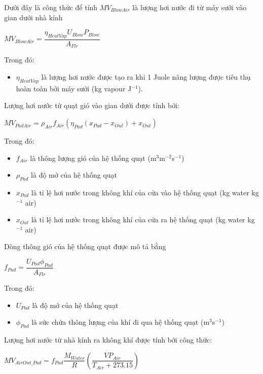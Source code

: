 \documentclass[a4paper]{article}
\begin{document}
    \vspace{5mm}
    
    Dưới đây là công thức để tính $MV_{BlowAir}$ là lượng hơi nước đi từ máy sưởi vào gian dưới nhà kính
    \begin{center}
        $MV_{BlowAir} = \dfrac{\eta_{HeatVap}U_{Blow}P_{Blow}}{A_{Flr}}$
    \end{center}
    Trong đó:
    \begin{itemize}
        \item $\eta_{HeatVap}$ là lượng hơi nước được tạo ra khi 1 Juole năng lượng được tiêu thụ hoàn toàn bởi máy sưởi (kg vapour J$^{-1}$).
    \end{itemize}
    
    \vspace{5mm}
    
    Lượng hơi nước từ quạt gió vào gian dưới được tính bởi:
    \begin{center}
        $MV_{PadAir} = \rho_{Air}f_{Air}(\eta_{Pad}(x_{Pad} - x_{Out}) + x_{Out})$
    \end{center}
    Trong đó:
    \begin{itemize}
        \item $f_{Air}$ là thông lượng gió của hệ thống quạt (m$^3$m$^{-2}$s$^{-1}$)
        \item $\rho_{Pad}$ là độ mở của hệ thống quạt
        \item $x_{Pad}$ là tỉ lệ hơi nước trong không khí của cửa vào hệ thống quạt (kg water kg$^{-1}$ air)
        \item $x_{Out}$ là tỉ lệ hơi nước trong không khí của cửa ra hệ thống quạt (kg water kg$^{-1}$ air)
    \end{itemize}
    Dòng thông gió của hệ thống quạt được mô tả bằng
    \begin{center}
        $f_{Pad} = \dfrac{U_{Pad}\phi_{Pad}}{A_{Flr}}$
    \end{center}
    Trong đó:
    \begin{itemize}
        \item $U_{Pad}$ là độ mở của hệ thống quạt
        \item $\phi_{Pad}$ là sức chứa thông lượng của  khí đi qua hệ thống quạt (m$^3$s$^{-1}$)   
    \end{itemize}
    
    \vspace{5mm}
    
    Lượng hơi nước từ nhà kính ra không khí được tính bới công thức:
    \begin{center}
        $MV_{AirOut\_Pad} = f_{Pad}\dfrac{M_{Water}}{R}\left(\dfrac{VP_{Air}}{T_{Air} + 273.15}\right)$
    \end{center}
    
\end{document}
